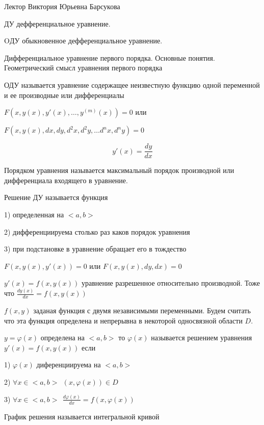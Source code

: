 Лектор Виктория Юрьевна Барсукова

ДУ дефференциальное уравнение.

OДУ обыкновенное дефференциальное уравнение.

\begin{title}[\Large]
  Дифференциальное уравнение первого порядка. Основные понятия. Геометрический
  смысл уравнения первого порядка
\end{title}

\begin{define}
  ОДУ называется уравнение содержащее неизвестную функцию одной переменной и ее
  производные или дифференциалы

  $F(x, y(x), y'(x), \ldots, y^{(m)} (x)) = 0$ или


  $F(x, y(x), dx, dy, d^2 x, d^2 y, \ldots d^n x, d^n y) = 0$

  $$
  y'(x) = \frac{dy}{dx}
  $$
\end{define}

\begin{define}
  Порядком уравнения называется максимальный порядок производной или
  дифференциала входящего в уравнение.
\end{define}

\begin{define}[решения ДУ]
  Решение ДУ называется функция

  1) определенная на $<a,b>$

  2) дифференциируема столько раз каков порядок уравнения

  3) при подстановке в уравнение обращает его в тождество
\end{define}

\begin{block}[ДУ 1 порядка]
  $F(x, y(x), y'(x)) = 0$ или $F(x, y(x), dy, dx) = 0$

  $y'(x) = f(x, y(x))$ уравнение разрешенное относительно производной. Тоже
  что $\frac{dy(x)}{dx} = f(x, y(x))$

  $f(x, y)$ заданая функция с двумя независимыми переменными. Будем считать
  что эта функция определена и непрерывна в некоторой односвязной области $D$.
\end{block}

\begin{define}
  $y = \varphi (x)$ определена на $<a,b>$ то $\varphi (x)$
  называется решением уравнения $y'(x) = f(x, y(x))$ если

  1) $\varphi (x)$ диференциируема на $<a,b>$

  2) $\forall x \in <a,b> ~~ (x, \varphi(x)) \in D$

  3) $\forall x \in <a,b> ~~ \frac{d\varphi (x)}{dx} = f(x, \varphi(x))$

  График решения называется интегральной кривой
\end{define}

